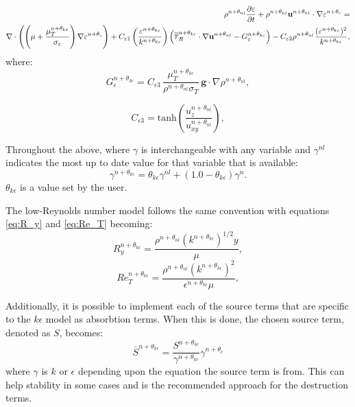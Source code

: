 \begin{align}\label{eq:eps_td}
  \rho^{n+\theta_{nl}}\frac{\partial \varepsilon}{\partial t} +
  \rho^{n+\theta_{nl}}\mathbf{u}^{n+\theta_{nl}}\cdot \nabla
  \varepsilon^{n+\theta_c} =
  \nonumber \\
  \nabla\cdot\left(\left(\mu + \frac{\mu_T^{n+\theta_{k\varepsilon}}}{\sigma_\varepsilon}\right)
    \nabla{\varepsilon^{n+\theta_c}} \right) + C_{\varepsilon1} \left(
    \frac{\varepsilon^{n+\theta_{k\varepsilon}}}{k^{n+\theta_{k\varepsilon}}} \right) \left(
    \overline{\overline{\tau}}_R^{n+\theta_{k\varepsilon}} \cdot \nabla\mathbf{u}^{n+\theta_{nl}} -
    G_\varepsilon^{n+\theta_{k\varepsilon}} \right) - C_{\varepsilon2} \rho^{n+\theta_{nl}}
  \frac{(\varepsilon^{n+\theta_{k\varepsilon}})^2}{k^{n+\theta_{k\varepsilon}}} ,
\end{align}
\noindent where:
\begin{equation}\label{eq:g_eps_td}
  G_\epsilon^{n+\theta_{k\epsilon}} = C_{\epsilon3} \, \frac{\mu_T^{n+\theta_{k\epsilon}}}{\rho^{n+\theta_{nl}}\sigma_T} \, \mathbf{g}\cdot\nabla \rho^{n+\theta_{nl}},
\end{equation}

\begin{equation}\label{eq:Cepsilon3_td}
  C_{\epsilon3} = \mathrm{tanh}\left ( \frac{u_z^{n+\theta_{nl}}}{u_{xy}^{n+\theta_{nl}}}  \right ),
\end{equation}

Throughout the above, where $\gamma$ is interchangeable with any variable and
$\gamma^{nl}$ indicates the most up to date value for that variable that is available:
\begin{equation}
  \gamma^{n+\theta_{k\epsilon}} =  \theta_{k\epsilon} \gamma^{nl} + \left( 1.0 - \theta_{k\epsilon} \right) \gamma^n .
\end{equation}
$\theta_{k\epsilon}$ is a value set by the user.

The low-Reynolds number model follows the same convention with equations \ref{eq:R_y} and
\ref{eq:Re_T} becoming:
\begin{equation}\label{eq:R_y_td}
  R_y^{n+\theta_{k\epsilon}} = \frac{\rho^{n+\theta_{nl}} (k^{n+\theta_{k\epsilon}})^{1/2} y}{\mu},
\end{equation}
\begin{equation}\label{eq:Re_T_td}
  Re_T^{n+\theta_{k\epsilon}} = \frac{\rho^{n+\theta_{nl}} (k^{n+\theta_{k\epsilon}})^2}{\epsilon^{n+\theta_{k\epsilon}} \mu},
\end{equation}

Additionally, it is possible to implement each of the source terms that are specific to the $k\epsilon$ model as absorbtion terms. When this is done, the chosen source term, denoted as $S$, becomes:
\begin{equation}
  \bar{S}^{n+\theta_{k\epsilon}} = \frac{S^{n+\theta_{k\epsilon}}}{\gamma^{n+\theta_{k\epsilon}}}\gamma^{n+\theta_c}
\end{equation}
\noindent where $\gamma$ is $k$ or $\epsilon$ depending upon the equation the source term is from. This can help stability in some cases and is the recommended approach for the destruction terms.

